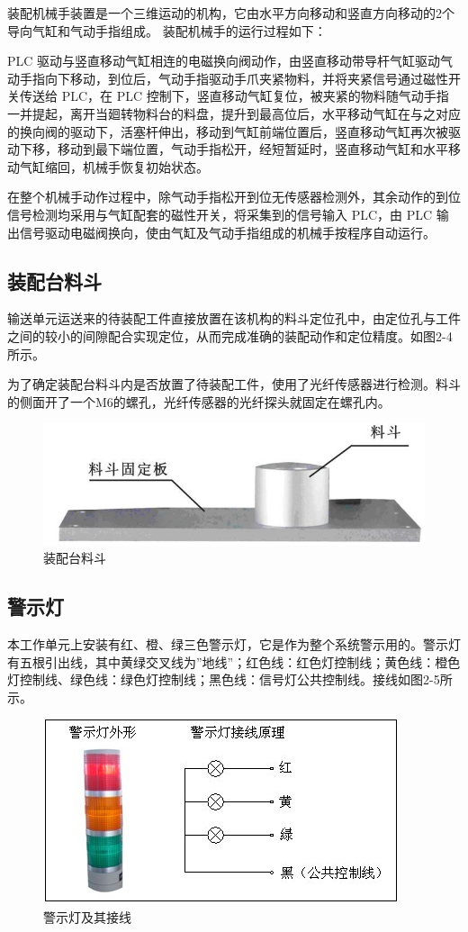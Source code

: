 \documentclass[12pt]{article}
\begin{document}
装配机械手装置是一个三维运动的机构，它由水平方向移动和竖直方向移动的2个导向气缸和气动手指组成。 装配机械手的运行过程如下：

PLC 驱动与竖直移动气缸相连的电磁换向阀动作，由竖直移动带导杆气缸驱动气动手指向下移动，到位后，气动手指驱动手爪夹紧物料，并将夹紧信号通过磁性开关传送给 PLC，在 PLC 控制下，竖直移动气缸复位，被夹紧的物料随气动手指一并提起，离开当廻转物料台的料盘，提升到最高位后，水平移动气缸在与之对应的换向阀的驱动下，活塞杆伸出，移动到气缸前端位置后，竖直移动气缸再次被驱动下移，移动到最下端位置，气动手指松开，经短暂延时，竖直移动气缸和水平移动气缸缩回，机械手恢复初始状态。 

在整个机械手动作过程中，除气动手指松开到位无传感器检测外，其余动作的到位信号检测均采用与气缸配套的磁性开关，将采集到的信号输入 PLC，由 PLC 输出信号驱动电磁阀换向，使由气缸及气动手指组成的机械手按程序自动运行。 

\subsection{装配台料斗}
输送单元运送来的待装配工件直接放置在该机构的料斗定位孔中，由定位孔与工件之间的较小的间隙配合实现定位，从而完成准确的装配动作和定位精度。如图2-4所示。

为了确定装配台料斗内是否放置了待装配工件，使用了光纤传感器进行检测。料斗的侧面开了一个M6的螺孔，光纤传感器的光纤探头就固定在螺孔内。 
\begin{figure}[htbp]
    \centering
    \includegraphics[scale=0.8]{fig/2-4.jpg}
    \caption{装配台料斗}
\end{figure} 

\subsection{警示灯}
本工作单元上安装有红、橙、绿三色警示灯，它是作为整个系统警示用的。警示灯有五根引出线，其中黄绿交叉线为”地线”；红色线：红色灯控制线；黄色线：橙色灯控制线、绿色线：绿色灯控制线；黑色线：信号灯公共控制线。接线如图2-5所示。
\begin{figure}[htbp]
    \centering
    \includegraphics[scale=0.8]{fig/2-5.jpg}
    \caption{警示灯及其接线}
\end{figure} 
\end{document}
